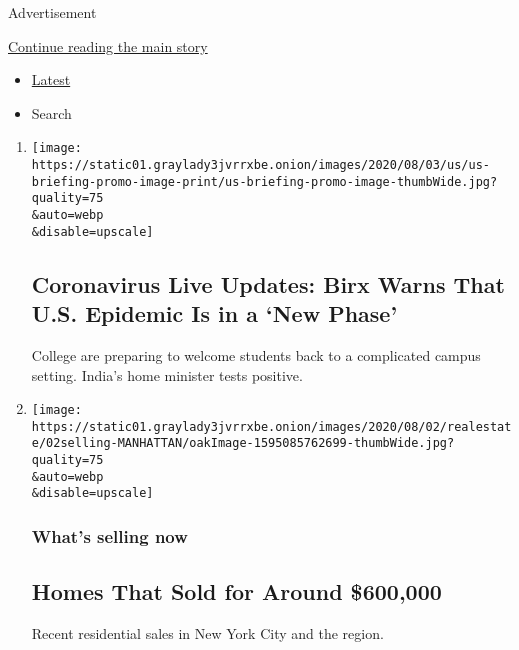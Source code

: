 Advertisement

\protect\hyperlink{after-mid1}{Continue reading the main story}

\begin{itemize}
\tightlist
\item
  \protect\hyperlink{stream-panel}{Latest}
\item
  Search
\end{itemize}

\begin{enumerate}
\def\labelenumi{\arabic{enumi}.}
\item
  \href{/2020/08/02/world/coronavirus-covid-19.html}{}

  \texttt{[image: https://static01.graylady3jvrrxbe.onion/images/2020/08/03/us/us-briefing-promo-image-print/us-briefing-promo-image-thumbWide.jpg?quality=75\\\&auto=webp\\\&disable=upscale]}

  \hypertarget{coronavirus-live-updates-birx-warns-that-us-epidemic-is-in-a-new-phase}{%
  \subsection{Coronavirus Live Updates: Birx Warns That U.S. Epidemic Is
  in a `New
  Phase'}\label{coronavirus-live-updates-birx-warns-that-us-epidemic-is-in-a-new-phase}}

  College are preparing to welcome students back to a complicated campus
  setting. India's home minister tests positive.
\item
  \href{/2020/08/02/realestate/homes-that-sold-for-around-600000.html}{}

  \texttt{[image: https://static01.graylady3jvrrxbe.onion/images/2020/08/02/realestate/02selling-MANHATTAN/oakImage-1595085762699-thumbWide.jpg?quality=75\\\&auto=webp\\\&disable=upscale]}

  \hypertarget{whats-selling-now}{%
  \subsubsection{What's selling now}\label{whats-selling-now}}

  \hypertarget{homes-that-sold-for-around-600000}{%
  \subsection{Homes That Sold for Around
  \$600,000}\label{homes-that-sold-for-around-600000}}

  Recent residential sales in New York City and the region.


\end{enumerate}
